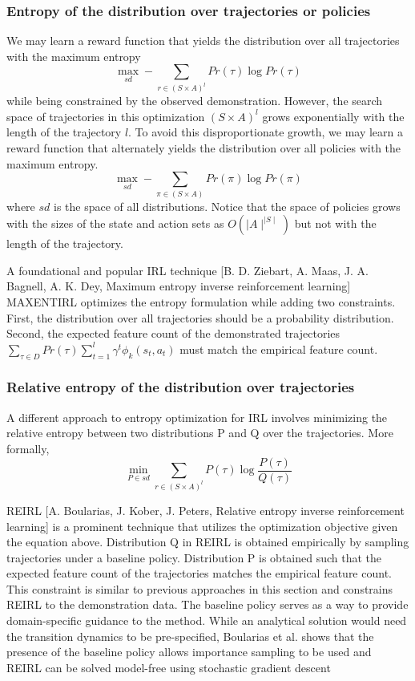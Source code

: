 \documentclass[11pt]{article}
\begin{document}
\subsubsection{Entropy of the distribution over trajectories or policies}
We may learn a reward function that yields the distribution over all trajectories with the maximum entropy
$$\max_{sd} - \sum_{r \in (S \times A)^{l}} Pr(\tau)\log Pr(\tau)$$
while being constrained by the observed demonstration. However, the search
space of trajectories in this optimization $(S \times A)^{l}$ grows exponentially with the length of the trajectory $l$. To avoid this disproportionate growth, we may learn a reward function that alternately yields the distribution over all policies with the maximum entropy.
$$\max_{sd} - \sum_{\pi \in (S \times A)} Pr(\pi)\log Pr(\pi)$$
where $sd$ is the space of all distributions. Notice that the space of policies grows with the sizes of the state and action sets as $O(\mid A \mid^{\mid S \mid})$ but not with the length of the trajectory.

A foundational and popular IRL technique [B. D. Ziebart, A. Maas, J. A. Bagnell, A. K. Dey, Maximum entropy inverse reinforcement learning] MAXENTIRL optimizes the entropy formulation while adding two constraints.
First, the distribution over all trajectories should be a probability distribution. Second, the expected feature count of the demonstrated trajectories $\sum_{\tau \in D} Pr(\tau) \sum_{t=1}^{l} \gamma^{t} \phi_{k} (s_t, a_t)$ must match the empirical feature count.

\subsubsection{Relative entropy of the distribution over trajectories}
A different approach to entropy optimization for IRL involves minimizing
the relative entropy between two distributions P and Q over the trajectories. More formally,
$$\min_{P \in sd} \sum_{r \in (S \times A)^{l}} P(\tau) \log \frac{P(\tau)}{Q(\tau)}$$

REIRL [A. Boularias, J. Kober, J. Peters, Relative entropy inverse reinforcement learning] is a prominent technique that utilizes the optimization objective given the equation above. Distribution Q in REIRL is obtained empirically by sampling trajectories under a baseline policy. Distribution P is obtained such that the expected feature count of the trajectories matches the empirical feature count. This constraint is similar to previous approaches in this section and constrains REIRL to the demonstration data. The baseline policy serves as a way to provide domain-specific guidance to the method. While an analytical solution would need the transition dynamics to be pre-specified, Boularias et al. shows that the presence of the baseline policy allows importance sampling to be used and REIRL can be solved model-free using stochastic gradient descent
\end{document}
